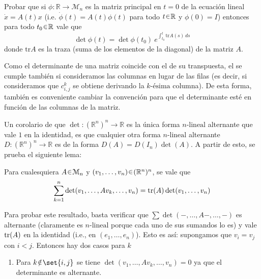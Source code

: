 \begin{ejer} 
Probar que si $\phi:\mathbb{R} \to \mathcal{M}_n$ es la matriz principal en $t=0$ de la ecuación lineal $\dot{x} = A(t)x$ (i.e. $\dot{\phi}(t) = A(t)\phi(t)$ para todo $t \en \mathbb{R}$ y $\phi(0) = I$) entonces para todo $t_0 \en \mathbb{R}$ vale que
\[
\det\phi(t) = \det\phi(t_0) \ e^{\int_{t_0}^{t} \mathrm{tr}A(s)\,ds}
\]
donde $\mathrm{tr}A$ es la traza (suma de los elementos de la diagonal) de la matriz $A$.
\end{ejer}
\begin{sol}[Demostración]
\begin{nota}
Como el determinante de una matriz coincide con el de su transpuesta, el  se cumple también si consideramos las columnas en lugar de las filas (es decir, si consideramos que $c^k_{i,j}$ se obtiene derivando la $k\text{-ésima}$ columna). De esta forma, también es conveniente cambiar la convención para que el determinante esté en función de las columnas de la matriz.
\end{nota}
Un corolario de que $\det \colon (\mathbb{R}^n)^n \to \mathbb{R}$ es la única forma $n\text{-lineal}$ alternante que vale $1$ en la identidad, es que cualquier otra forma $n\text{-lineal}$ alternante $D \colon (\mathbb{R}^n)^n \to \mathbb{R}$ es de la forma $D(A) = D(I_n)\det(A)$. A partir de esto, se prueba el siguiente lema:
\begin{lema}\label{lema:traza}
Para cualesquiera $A \en \mathcal{M}_n$ y $(v_1,\dots,v_n) \en (\mathbb{R}^n)^n$, se vale que
\[
\sum^n_{k=1} \det(v_1,\dots,Av_k,\dots,v_n) = \tr(A)\det(v_1,\dots,v_n)
\]
\end{lema}
Para probar este resultado, basta verificar que $\sum \det(-,\dots,A-,\dots,-)$ es alternante (claramente es $n\text{-lineal}$ porque cada uno de sus sumandos lo es) y vale $\tr(A)$ en la identidad (i.e., en $(e_1,\dots,e_n)$). Esto es así: supongamos que $v_i = v_j$ con $i < j$. Entonces hay dos casos para $k$
\begin{enumerate}[label = (\roman*)]
\item Para $k \noten \set{i,j}$ se tiene $\det(v_1,\dots,Av_k,\dots,v_n) = 0$ ya que el determinante es alternante.


\end{enumerate}
\end{sol}
